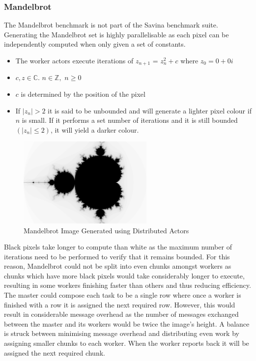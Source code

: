 \documentclass[12pt, a4paper]{report}
\theoremstyle{definition}
\theoremstyle{definition}%
\theoremstyle{definition}%
\theoremstyle{definition}%
\theoremstyle{definition}%
\theoremstyle{definition}%
\begin{document}
\subsubsection{Mandelbrot}
The Mandelbrot benchmark is not part of the Savina benchmark suite. Generating the Mandelbrot set is highly parallelisable as each pixel can be independently computed when only given a set of constants. 
\begin{itemize}
    \item The worker actors execute iterations of $z_{n+1}$ = $z_{n}^{2}+c$ where $z_0 = 0 + 0i$
    \item $c, z \in \mathbb{C}$. $n \in \mathbb{Z},$ $n \ge 0$
    \item $c$ is determined by the position of the pixel
    \item If $|z_n|> 2$ it is said to be unbounded and will generate a lighter pixel colour if $n$ is small. If it performs a set number of iterations and it is still bounded $(|z_n| \le 2)$, it will yield a darker colour.
\end{itemize}
\begin{figure}[H]
    \begin{centering}
        \includegraphics[width=250px]{resources/mandelbrot.png}
        \caption{Mandelbrot Image Generated using Distributed Actors}
    \end{centering}
\end{figure}
Black pixels take longer to compute than white as the maximum number of iterations need to be performed to verify that it remains bounded. For this reason, Mandelbrot could not be split into even chunks amongst workers as chunks which have more black pixels would take considerably longer to execute, resulting in some workers finishing faster than others and thus reducing efficiency. The master could compose each task to be a single row where once a worker is finished with a row it is assigned the next required row. However, this would result in considerable message overhead as the number of messages exchanged between the master and its workers would be twice the image’s height. A balance is struck between minimising message overhead and distributing even work by assigning smaller chunks to each worker. When the worker reports back it will be assigned the next required chunk.
\end{document}
